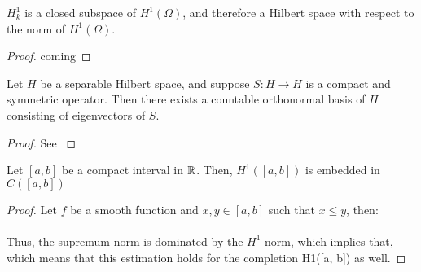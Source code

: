 \begin{atheorem}
	$H^{1}_{k}$ is a closed subspace of $H^{1}(\Omega)$, and therefore a  Hilbert space with respect to the norm of $H^{1}(\Omega)$.
	
	\begin{proof} %
		coming
	\end{proof}
\end{atheorem}

\begin{atheorem}
	Let $H$ be a separable Hilbert space, and suppose $S \colon H \rightarrow H$ is a compact and symmetric operator. Then there exists a countable orthonormal basis of $H$ consisting of eigenvectors of $S$.
	
	\begin{proof}
		See \cite[page 645]{Evans98}
	\end{proof}
\end{atheorem}

\begin{atheorem}
	Let $[a, b]$ be a compact interval in $\mathbb{R}$. Then, $H^{1}([a, b])$ is embedded in $C([a, b])$
	
	\begin{proof}
		Let $f$ be a smooth function and $x, y \in [a, b]$ such that $x \leq y$, then:
		~\\ ~\\ %
		Thus, the supremum norm is dominated by the $H^{1}$-norm, which implies that, which means that this estimation holds for the completion H1([a, b]) as well.
	\end{proof}
\end{atheorem}

